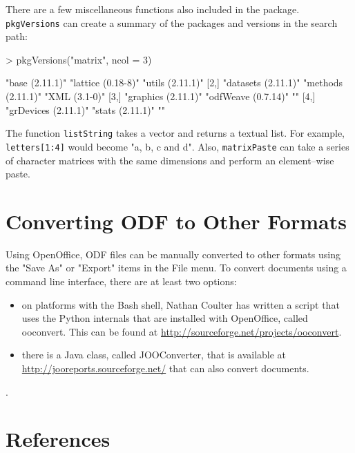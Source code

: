 \documentclass[12pt]{article}
\begin{document}
There are a few miscellaneous functions also included in the package. \texttt{pkgVersions} can create a summary of the packages and versions in the search path:
\begin{Schunk}
\begin{Sinput}
> pkgVersions("matrix", ncol = 3)
\end{Sinput}
\begin{Soutput}
     [,1]                 [,2]                [,3]            
[1,] "base (2.11.1)"      "lattice (0.18-8)"  "utils (2.11.1)"
[2,] "datasets (2.11.1)"  "methods (2.11.1)"  "XML (3.1-0)"   
[3,] "graphics (2.11.1)"  "odfWeave (0.7.14)" ""              
[4,] "grDevices (2.11.1)" "stats (2.11.1)"    ""              
\end{Soutput}
\end{Schunk}
The function \texttt{listString} takes a vector and returns a textual list. For example,  \verb|letters[1:4]| would become "a, b, c and d". Also, \texttt{matrixPaste} can take a series of character matrices with the same dimensions and perform an element--wise paste.

\section{Converting ODF to Other Formats}

Using OpenOffice, ODF files can be manually converted to other formats using the  "Save As" or "Export" items in the File menu. To convert documents using a command line interface, there are at least two options:
\begin{itemize}
\item on platforms with the Bash shell, Nathan Coulter has written a script that uses the Python internals that are installed with OpenOffice, called ooconvert. This can be found at \linebreak \href{http://sourceforge.net/projects/ooconvert} {http://sourceforge.net/projects/ooconvert}.
\item there is a Java class, called  JOOConverter, that is available at \href{http://jooreports.sourceforge.net/} {http://jooreports.sourceforge.net/} that can also convert documents.
\end{itemize}.



\section{References}
\end{document}
